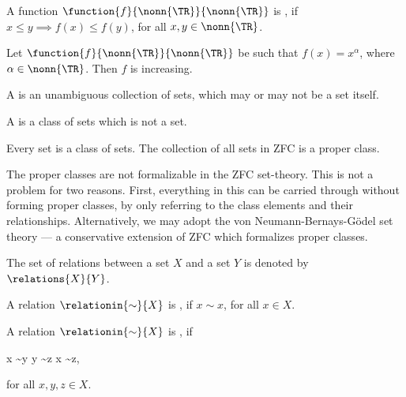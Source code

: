 \documentclass[b5paper, english, oneside]{memoir}
\begin{document}
\begin{definition}
A function $\function{f}{\nonn{\TR}}{\nonn{\TR}}$ is , if $x \leq y \implies f(x) \leq f(y)$, for all $x, y \in \nonn{\TR}$. 
\end{definition}

\begin{example}
Let $\function{f}{\nonn{\TR}}{\nonn{\TR}}$ be such that $f(x) = x^{\alpha}$, where $\alpha \in \nonn{\TR}$. Then $f$ is increasing.
\end{example}

\begin{definition}
A  is an unambiguous collection of sets, which may or may not be a set itself. 
\end{definition}

\begin{definition}
A  is a class of sets which is not a set. 
\end{definition}

\begin{example}
Every set is a class of sets. The collection of all sets in ZFC is a proper class.
\end{example}

\begin{note}
The proper classes are not formalizable in the ZFC set-theory. This is not a problem for two reasons. First, everything in this \manuscript{} can be carried through without forming proper classes, by only referring to the class elements and their relationships. Alternatively, we may adopt the von Neumann-Bernays-G\"odel set theory \cite{IntroToMathematicalLogic} --- a conservative extension of ZFC which formalizes proper classes.
\end{note}

\begin{definition}
The set of relations between a set $X$ and a set $Y$ is denoted by $\relations{X}{Y}$. 
\end{definition}

\begin{definition}
A relation $\relationin{\sim}{X}$ is , if $x \sim x$, for all $x \in X$.
\end{definition}

\begin{definition}
A relation $\relationin{\sim}{X}$ is , if
\begin{eqs}
x \sim y \land y \sim z \implies x \sim z,
\end{eqs}
for all $x, y, z \in X$.
\end{definition}
\end{document}
